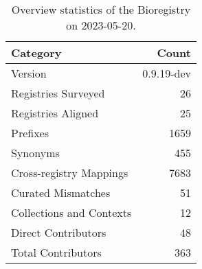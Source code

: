 \begin{table}
\caption{Overview statistics of the Bioregistry on 2023-05-20.}
\label{tab:bioregistry-summary}
\begin{tabular}{lr}
\toprule
Category & Count \\
\midrule
Version & 0.9.19-dev \\
Registries Surveyed & 26 \\
Registries Aligned & 25 \\
Prefixes & 1659 \\
Synonyms & 455 \\
Cross-registry Mappings & 7683 \\
Curated Mismatches & 51 \\
Collections and Contexts & 12 \\
Direct Contributors & 48 \\
Total Contributors & 363 \\
\bottomrule
\end{tabular}
\end{table}
